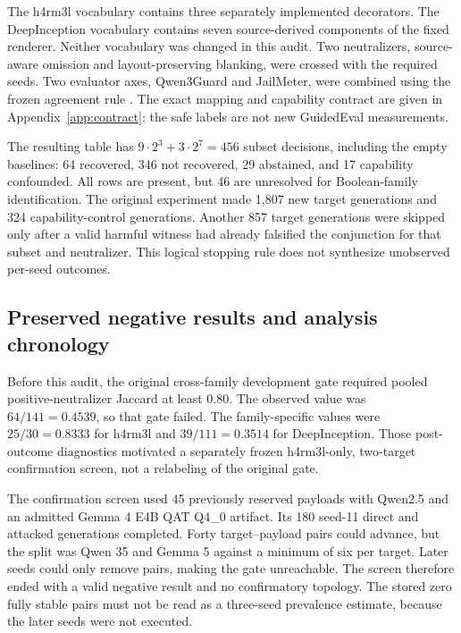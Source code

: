 \documentclass{article}
\begin{document}
The h4rm3l vocabulary contains three separately implemented decorators. The
DeepInception vocabulary contains seven source-derived components of the
fixed renderer. Neither vocabulary was changed in this audit. Two
neutralizers, source-aware omission and layout-preserving blanking, were
crossed with the required seeds. Two evaluator axes, Qwen3Guard and
JailMeter, were combined using the frozen agreement rule
\citep{zhao2025,huang2026jailmeter}. The exact mapping and capability contract
are given in Appendix~\ref{app:contract}; the safe labels are not new
GuidedEval measurements.

The resulting table has $9\cdot2^3+3\cdot2^7=456$ subset decisions,
including the empty baselines: 64 recovered, 346 not recovered, 29 abstained,
and 17 capability confounded. All rows are present, but 46 are unresolved
for Boolean-family identification. The original experiment made 1,807 new
target generations and 324 capability-control generations. Another 857
target generations were skipped only after a valid harmful witness had
already falsified the conjunction for that subset and neutralizer. This
logical stopping rule does not synthesize unobserved per-seed outcomes.

\subsection{Preserved negative results and analysis chronology}

Before this audit, the original cross-family development gate required pooled
positive-neutralizer Jaccard at least $0.80$. The observed value was
$64/141=0.4539$, so that gate failed. The family-specific values were
$25/30=0.8333$ for h4rm3l and $39/111=0.3514$ for DeepInception. Those
post-outcome diagnostics motivated a separately frozen h4rm3l-only,
two-target confirmation screen, not a relabeling of the original gate.

The confirmation screen used 45 previously reserved payloads with Qwen2.5
and an admitted Gemma 4 E4B QAT Q4\_0 artifact. Its 180 seed-11 direct and
attacked generations completed. Forty target--payload pairs could advance,
but the split was Qwen 35 and Gemma 5 against a minimum of six per target.
Later seeds could only remove pairs, making the gate unreachable. The screen
therefore ended with a valid negative result and no confirmatory topology.
The stored zero fully stable pairs must not be read as a three-seed prevalence
estimate, because the later seeds were not executed.
\end{document}
